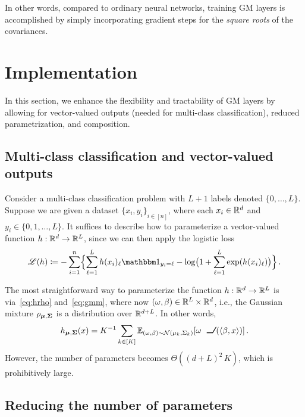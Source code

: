 \documentclass{custom}
\begin{document}
In other words, compared to ordinary neural networks, training GM layers is accomplished by simply incorporating gradient steps for the \emph{square roots} of the covariances.


\section{Implementation}\label{sec:implementation}


In this section, we enhance the flexibility and tractability of GM layers by allowing for vector-valued outputs (needed for multi-class classification), reduced parametrization, and composition.


\subsection{Multi-class classification and vector-valued outputs}


Consider a multi-class classification problem with $L+1$ labels denoted $\{0, \dots, L\}$.  Suppose we are given a dataset ${\{x_i,y_i\}}_{i\in [n]}$, where each $x_i\in\mathbb R^d$ and $y_i \in \{0,1,\dotsc,L\}$.
It suffices to describe how to parameterize a vector-valued function $h : \mathbb R^d\to\mathbb R^{L}$, since we can then apply the logistic loss 
$$
\ms L(h) \deq -\sum_{i=1}^n \Bigl\{\sum_{\ell=1}^{L} h(x_i)_\ell \ind_{y_i = \ell} - \log\bigl(1+\sum_{\ell=1}^{L} \exp(h(x_i)_\ell)\bigr)\Bigr\}\,.
$$

The most straightforward way to parameterize the function $h: \mathbb R^d \to \mathbb R^{L}$ is via~\eqref{eq:hrho} and~\eqref{eq:gmm}, where now $(\omega,\beta) \in \mathbb R^{L}\times\mathbb R^d$, i.e., the Gaussian mixture $\rho_{\boldsymbol \mu,\boldsymbol \Sigma}$ is a distribution over $\mathbb R^{d+L}$.
In other words,
\begin{align}\label{eq:hgmm}
    h_{\bs\mu,\bs\Sigma}(x) = K^{-1} \sum_{k\in [K]} \E_{(\omega,\beta)\sim\mc N(\mu_k,\Sigma_k)}[\omega\ReLU(\langle \beta,x\rangle)]\,.
\end{align}
However, the number of parameters becomes  $\Theta((d+L)^2\,K)$, which is prohibitively large.


\subsection{Reducing the number of parameters}\label{subsec:reducing_param}
\end{document}
